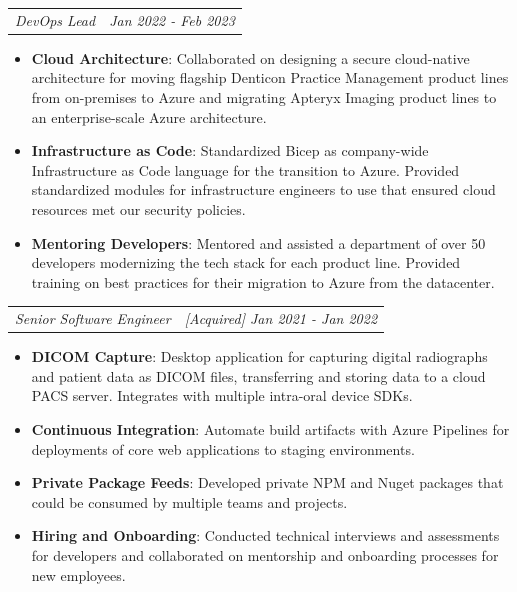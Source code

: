 \documentclass[letterpaper,11pt]{article}
\makeatletter
\newcommand{\resumeItem}[2]{
  \item\small{
    \textbf{#1}{: #2 \vspace{-2pt}}
  }
}
\newcommand{\resumeSubheading}[4]{
  \vspace{-1pt}\item
    \begin{tabular*}{0.97\textwidth}[t]{l@{\extracolsep{\fill}}r}
      \textbf{#1} & #2 \\
      \textit{\small#3} & \textit{\small #4} \\
    \end{tabular*}\vspace{-5pt}
}
\newcommand{\resumeSubheadingPosition}[2]{
  \vspace{-1pt}
    \begin{tabular*}{0.97\textwidth}[t]{l@{\extracolsep{\fill}}r}
      \textit{\small#1} & \textit{\small #2} \\
    \end{tabular*}\vspace{-5pt}
}
\newcommand{\resumeItemListStart}{\begin{itemize}}
\newcommand{\resumeItemListEnd}{\end{itemize}\vspace{-5pt}}
\makeatother
\begin{document}
  \resumeSubheadingPosition{DevOps Lead}{Jan 2022 - Feb 2023}
    \resumeItemListStart
      \resumeItem{Cloud Architecture}
        {Collaborated on designing a secure cloud-native architecture for moving flagship Denticon Practice Management product lines from on-premises to Azure and migrating Apteryx Imaging product lines to an enterprise-scale Azure architecture.}
      \resumeItem{Infrastructure as Code}
        {Standardized Bicep as company-wide Infrastructure as Code language for the transition to Azure. Provided standardized modules for infrastructure engineers to use that ensured cloud resources met our security policies.}
      \resumeItem{Mentoring Developers}
        {Mentored and assisted a department of over 50 developers modernizing the tech stack for each product line. Provided training on best practices for their migration to Azure from the datacenter.}
    \resumeItemListEnd

  \resumeSubheadingPosition{Senior Software Engineer}{[Acquired] Jan 2021 - Jan 2022}
    \resumeItemListStart
      \resumeItem{DICOM Capture}
        {Desktop application for capturing digital radiographs and patient data as DICOM files, transferring and storing data to a cloud PACS server. Integrates with multiple intra-oral device SDKs.}
      \resumeItem{Continuous Integration}
        {Automate build artifacts with Azure Pipelines for deployments of core web applications to staging environments.}
      \resumeItem{Private Package Feeds}
        {Developed private NPM and Nuget packages that could be consumed by multiple teams and projects.}
      \resumeItem{Hiring and Onboarding}
        {Conducted technical interviews and assessments for developers and collaborated on mentorship and onboarding processes for new employees.}
    \resumeItemListEnd

\end{document}
